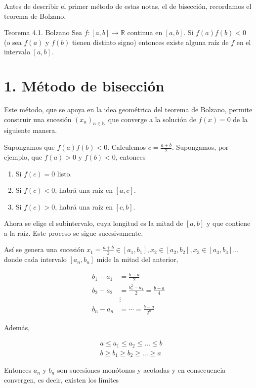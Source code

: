 \documentclass[10pt]{article}
\begin{document}
Antes de describir el primer método de estas notas, el de bisección, recordamos el teorema de Bolzano.

Teorema 4.1. Bolzano Sea $f:[a, b] \rightarrow \mathbb{R}$ continua en $[a, b]$. Si $f(a) f(b)<0$ (o sea $f(a)$ y $f(b)$ tienen distinto signo) entonces existe alguna raíz de $f$ en el intervalo $[a, b]$.

\section*{1. Método de bisección}
Este método, que se apoya en la idea geométrica del teorema de Bolzano, permite construir una sucesión $\left(x_{n}\right)_{n \in \mathbb{N}}$ que converge a la solución de $f(x)=0$ de la siguiente manera.

Supongamos que $f(a) f(b)<0$. Calculemos $c=\frac{a+b}{2}$. Supongamos, por ejemplo, que $f(a)>0$ y $f(b)<0$, entonces

\begin{enumerate}
  \item Si $f(c)=0$ listo.
  \item Si $f(c)<0$, habrá una raíz en $[a, c]$.
  \item Si $f(c)>0$, habrá una raíz en $[c, b]$.
\end{enumerate}

Ahora se elige el subintervalo, cuya longitud es la mitad de $[a, b]$ y que contiene a la raíz. Este proceso se sigue sucesivamente.

Así se genera una sucesión $x_{1}=\frac{a+b}{2} \in\left[a_{1}, b_{1}\right], x_{2} \in\left[a_{2}, b_{2}\right], x_{3} \in\left[a_{3}, b_{3}\right] \ldots$ donde cada intervalo $\left[a_{n}, b_{n}\right]$ mide la mitad del anterior,

$$
\begin{aligned}
b_{1}-a_{1} & =\frac{b-a}{2} \\
b_{2}-a_{2} & =\frac{b_{1}^{2}-a_{1}}{2}=\frac{b-a}{4} \\
& \vdots \\
b_{n}-a_{n} & =\cdots=\frac{b-a}{2^{n}}
\end{aligned}
$$

Además,

$$
\begin{aligned}
& a \leq a_{1} \leq a_{2} \leq \ldots \leq b \\
& b \geq b_{1} \geq b_{2} \geq \ldots \geq a
\end{aligned}
$$

Entonces $a_{n}$ y $b_{n}$ son sucesiones monótonas y acotadas y en consecuencia convergen, es decir, existen los límites
\end{document}
